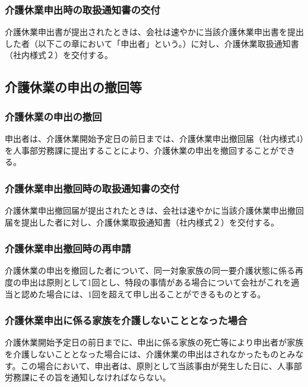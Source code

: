 \documentclass{jsarticle}
\begin{document}
\subsubsection{介護休業申出時の取扱通知書の交付}
\label{育介_項_介護休業申出時の取扱通知書の交付}
介護休業申出書が提出されたときは、会社は速やかに当該介護休業申出書を提出した者（以下この章において「申出者」という。）に対し、介護休業取扱通知書（社内様式２）を交付する。

\subsection{介護休業の申出の撤回等}
\label{育介_条_介護休業の申出の撤回等}

\subsubsection{介護休業の申出の撤回}
\label{育介_項_介護休業の申出の撤回}
申出者は、介護休業開始予定日の前日までは、介護休業申出撤回届（社内様式4）を人事部労務課に提出することにより、介護休業の申出を撤回することができる。

\subsubsection{介護休業申出撤回時の取扱通知書の交付}
\label{育介_項_介護休業申出撤回時の取扱通知書の交付}
介護休業申出撤回届が提出されたときは、会社は速やかに当該介護休業申出撤回届を提出した者に対し、介護休業取扱通知書（社内様式２）を交付する。

\subsubsection{介護休業申出撤回時の再申請}
\label{育介_項_介護休業申出撤回時の再申請}
介護休業の申出を撤回した者について、同一対象家族の同一要介護状態に係る再度の申出は原則として1回とし、特段の事情がある場合について会社がこれを適当と認めた場合には、1回を超えて申し出ることができるものとする。 

\subsubsection{介護休業申出に係る家族を介護しないこととなった場合}
\label{育介_項_介護休業申出に係る家族を介護しないこととなった場合}
介護休業開始予定日の前日までに、申出に係る家族の死亡等により申出者が家族を介護しないこととなった場合には、介護休業の申出はされなかったものとみなす。この場合において、申出者は、原則として当該事由が発生した日に、人事部労務課にその旨を通知しなければならない。
\end{document}

